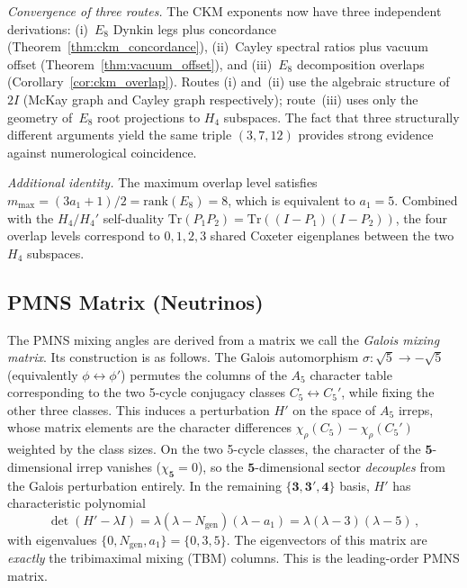 \documentclass[12pt,a4paper]{article}
\theoremstyle{definition}
\begin{document}
\noindent\textit{Convergence of three routes.}  The CKM exponents now have three independent derivations: (i)~$E_8$ Dynkin legs plus concordance (Theorem~\ref{thm:ckm_concordance}), (ii)~Cayley spectral ratios plus vacuum offset (Theorem~\ref{thm:vacuum_offset}), and (iii)~$E_8$ decomposition overlaps (Corollary~\ref{cor:ckm_overlap}).  Routes (i) and~(ii) use the algebraic structure of $2I$ (McKay graph and Cayley graph respectively); route~(iii) uses only the geometry of~$E_8$ root projections to $H_4$ subspaces.  The fact that three structurally different arguments yield the same triple $(3, 7, 12)$ provides strong evidence against numerological coincidence.

\noindent\textit{Additional identity.}  The maximum overlap level satisfies $m_{\max} = (3a_1 + 1)/2 = \mathrm{rank}(E_8) = 8$, which is equivalent to $a_1 = 5$.  Combined with the $H_4/H_4'$ self-duality $\mathrm{Tr}(P_1 P_2) = \mathrm{Tr}((I-P_1)(I-P_2))$, the four overlap levels correspond to $0, 1, 2, 3$ shared Coxeter eigenplanes between the two $H_4$ subspaces.

\subsection{PMNS Matrix (Neutrinos)}

The PMNS mixing angles are derived from a matrix we call the \emph{Galois mixing matrix}.  Its construction is as follows.  The Galois automorphism $\sigma: \sqrt{5} \to -\sqrt{5}$ (equivalently $\phi \leftrightarrow \phi'$) permutes the columns of the $A_5$ character table corresponding to the two 5-cycle conjugacy classes $C_5 \leftrightarrow C_5'$, while fixing the other three classes.  This induces a perturbation $H'$ on the space of $A_5$ irreps, whose matrix elements are the character differences $\chi_\rho(C_5) - \chi_\rho(C_5')$ weighted by the class sizes.  On the two 5-cycle classes, the character of the $\mathbf{5}$-dimensional irrep vanishes ($\chi_{\mathbf{5}} = 0$), so the $\mathbf{5}$-dimensional sector \emph{decouples} from the Galois perturbation entirely.  In the remaining $\{\mathbf{3}, \mathbf{3'}, \mathbf{4}\}$ basis, $H'$ has characteristic polynomial
\begin{equation}
\det(H' - \lambda I) = \lambda(\lambda - N_{\text{gen}})(\lambda - a_1) = \lambda(\lambda - 3)(\lambda - 5)\,,
\end{equation}
with eigenvalues $\{0, N_{\text{gen}}, a_1\} = \{0, 3, 5\}$.  The eigenvectors of this matrix are \emph{exactly} the tribimaximal mixing (TBM) columns.  This is the leading-order PMNS matrix.
\end{document}
